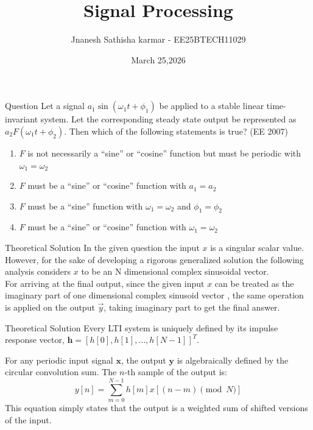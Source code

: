 \documentclass{beamer}
\title %
{Signal Processing}
\date{March 25,2026}
\author 
{Jnanesh Sathisha karmar - EE25BTECH11029}
\begin{document}
\frame{\titlepage}
\begin{frame}{Question}
Let a signal $a_1 \sin(\omega_1 t + \phi_1)$ be applied to a stable linear time-invariant system. Let the corresponding steady state output be represented as $a_2 F(\omega_1 t + \phi_2)$. Then which of the following statements is true? \hfill (EE 2007)

\begin{enumerate}
\item[(a)] $F$ is not necessarily a ``sine'' or ``cosine'' function but must be periodic with $\omega_1 = \omega_2$
\item[(b)] $F$ must be a ``sine'' or ``cosine'' function with $a_1 = a_2$
\item[(c)] $F$ must be a ``sine'' function with $\omega_1 = \omega_2$ and $\phi_1 = \phi_2$
\item[(d)] $F$ must be a ``sine'' or ``cosine'' function with $\omega_1 = \omega_2$
\end{enumerate}
\end{frame}

\begin{frame}{Theoretical Solution}
In the given question the input $x$ is a singular scalar value. However, for the sake of developing a rigorous generalized solution the following analysis considers $x$ to be an N dimensional complex sinusoidal vector.\\
For arriving at the final output, since the given input $x$ can be treated as the imaginary part of one dimensional complex sinusoid vector , the same operation is applied on the output $\vec{y}$, taking imaginary part to get the final answer.
\end{frame}

\begin{frame}{Theoretical Solution}
Every LTI system is uniquely defined by its impulse response vector, $\mathbf{h} = [h[0], h[1], \dots, h[N-1]]^T$. 

For any periodic input signal $\mathbf{x}$, the output $\mathbf{y}$ is algebraically defined by the circular convolution sum. The $n$-th sample of the output is:
\begin{equation}
y[n] = \sum_{m=0}^{N-1} h[m] x[(n - m) \pmod N]
\end{equation}
This equation simply states that the output is a weighted sum of shifted versions of the input.
\end{frame}
\end{document}
